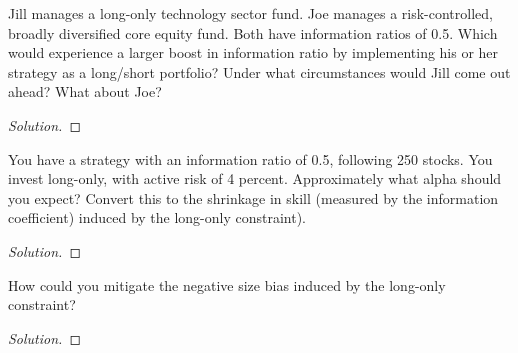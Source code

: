 \begin{problem}{15.1}
  Jill manages a long-only technology sector fund. Joe manages a risk-controlled, broadly diversified core equity fund. Both have information ratios of 0.5. Which would experience a larger boost in information ratio by implementing his or her strategy as a long/short portfolio? Under what circumstances would Jill come out ahead? What about Joe?
\end{problem}

\begin{proof}[Solution]
\end{proof}

\begin{problem}{15.2}
  You have a strategy with an information ratio of 0.5, following 250 stocks. You invest long-only, with active risk of 4 percent. Approximately what alpha should you expect? Convert this to the shrinkage in skill (measured by the information coefficient) induced by the long-only constraint).
\end{problem}

\begin{proof}[Solution]
\end{proof}

\begin{problem}{15.3}
  How could you mitigate the negative size bias induced by the long-only constraint?
\end{problem}

\begin{proof}[Solution]
\end{proof}

